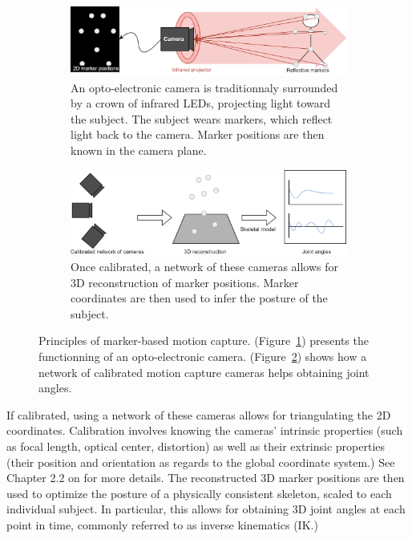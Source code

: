 \begin{figure}[hbtp]
	\centering
	\begin{subfigure}[b]{1\textwidth}
		\centering
		\def\svgwidth{\columnwidth}
		\fontsize{10pt}{10pt}\selectfont
		\includegraphics[width=\linewidth]{"../Chap1/Figures/Markers_1.png"}
		\caption{An opto-electronic camera is traditionnaly surrounded by a crown of infrared LEDs, projecting light toward the subject. The subject wears markers, which reflect light back to the camera. Marker positions are then known in the camera plane.}
		\label{fig_mk1}
	\end{subfigure}
	\qquad
	\begin{subfigure}[b]{1\textwidth}
		\centering
		\def\svgwidth{\columnwidth}
		\fontsize{10pt}{10pt}\selectfont
		\includegraphics[width=\linewidth]{"../Chap1/Figures/Markers_2.png"}
		\caption{Once calibrated, a network of these cameras allows for 3D reconstruction of marker positions. Marker coordinates are then used to infer the posture of the subject.}
		\label{fig_mk2}
	\end{subfigure}
	\caption{Principles of marker-based motion capture. (Figure~\ref{fig_mk1}) presents the functionning of an opto-electronic camera. (Figure~\ref{fig_mk2}) shows how a network of calibrated motion capture cameras helps obtaining joint angles.}
	\label{fig_mk}
\end{figure}

If calibrated, using a network of these cameras allows for triangulating the 2D coordinates. Calibration involves knowing the cameras' intrinsic properties (such as focal length, optical center, distortion) as well as their extrinsic properties (their position and orientation as regards to the global coordinate system.) See Chapter 2.2 on  for more details. The reconstructed 3D marker positions are then used to optimize the posture of a physically consistent skeleton, scaled to each individual subject. In particular, this allows for obtaining 3D joint angles at each point in time, commonly referred to as inverse kinematics (IK.)

